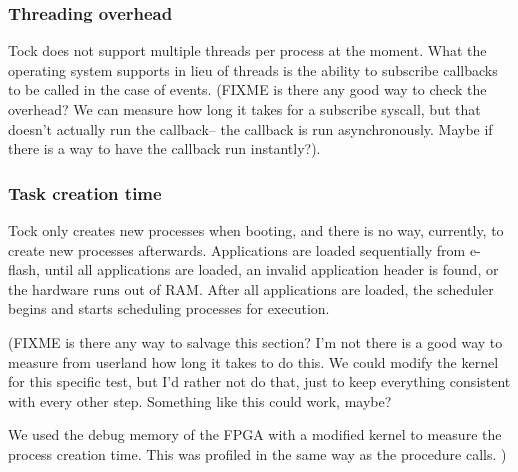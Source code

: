 \documentclass{article}
\begin{document}
\subsubsection{Threading overhead}

Tock does not support multiple threads per process at the moment. What the operating system supports in lieu of threads is the ability to subscribe callbacks to be called in the case of events. (FIXME is there any good way to check the overhead? We can measure how long it takes for a subscribe syscall, but that doesn't actually run the callback-- the callback is run asynchronously. Maybe if there is a way to have the callback run instantly?).

\subsubsection{Task creation time}

Tock only creates new processes when booting, and there is no way, currently, to create new processes afterwards. Applications are loaded sequentially from e-flash, until all applications are loaded, an invalid application header is found, or the hardware runs out of RAM. After all applications are loaded, the scheduler begins and starts scheduling processes for execution.

(FIXME is there any way to salvage this section? I'm not there is a good way to measure from userland how long it takes to do this. We could modify the kernel for this specific test, but I'd rather not do that, just to keep everything consistent with every other step. Something like this could work, maybe?

We used the debug memory of the FPGA with a modified kernel to measure the process creation time. This was profiled in the same way as the procedure calls.
)

\end{document}
